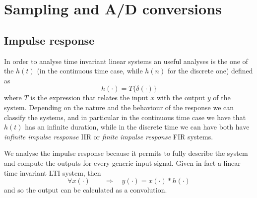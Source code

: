 \chapter{Sampling and A/D conversions}
\section{Impulse response}
	In order to analyse time invariant linear systems an useful analyses is the one of the  $h(t)$ (in the continuous time case, while $h(n)$ for the discrete one) defined as 
	\begin{equation}
		h(\cdot) = T\big\{ \delta(\cdot) \}
	\end{equation}
	where $T$ is the expression that relates the input $x$ with the output $y$ of the system. Depending on the nature and the behaviour of the response we can classify the systems, and in particular in the continuous time case we have that $h(t)$ has an infinite duration, while in the discrete time we can have both have \textit{infinite impulse response} IIR or \textit{finite impulse response} FIR systems.
	
	We analyse the impulse response because it permits to fully describe the system and compute the outputs for every generic input signal. Given in fact a linear time invariant LTI system, then 
	\[ \forall x(\cdot) \qquad \Rightarrow \quad y(\cdot) = x(\cdot) * h(\cdot) \]
	and so the output can be calculated as a convolution.
	
